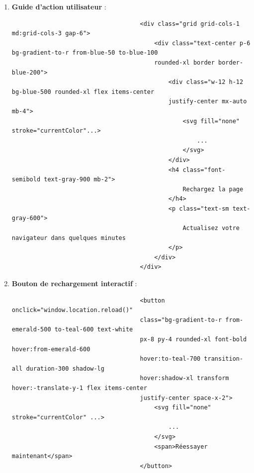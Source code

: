 \documentclass[a4paper,11pt]{article}
\begin{document}
\begin{enumerate}
                        \item \textbf{Guide d'action utilisateur} :
                            \begin{tcolorbox}[colback=lightgray!5, colframe=gray!80, left=-70mm, right=5mm, top=2mm, bottom=0mm, boxrule=0.1mm]
                                \begin{verbatim}
                                    <div class="grid grid-cols-1 md:grid-cols-3 gap-6">
                                        <div class="text-center p-6 bg-gradient-to-r from-blue-50 to-blue-100 
                                        rounded-xl border border-blue-200">
                                            <div class="w-12 h-12 bg-blue-500 rounded-xl flex items-center 
                                            justify-center mx-auto mb-4">
                                                <svg fill="none" stroke="currentColor"...>
                                                    ...
                                                </svg>
                                            </div>
                                            <h4 class="font-semibold text-gray-900 mb-2">
                                                Rechargez la page
                                            </h4>
                                            <p class="text-sm text-gray-600">
                                                Actualisez votre navigateur dans quelques minutes
                                            </p>
                                        </div>
                                    </div>
                                \end{verbatim}
                            \end{tcolorbox}

                        \item \textbf{Bouton de rechargement interactif} :
                            \begin{tcolorbox}[colback=lightgray!5, colframe=gray!80, left=-70mm, right=5mm, top=2mm, bottom=0mm, boxrule=0.1mm]
                                \begin{verbatim}
                                    <button onclick="window.location.reload()" 
                                    class="bg-gradient-to-r from-emerald-500 to-teal-600 text-white 
                                    px-8 py-4 rounded-xl font-bold hover:from-emerald-600 
                                    hover:to-teal-700 transition-all duration-300 shadow-lg 
                                    hover:shadow-xl transform hover:-translate-y-1 flex items-center 
                                    justify-center space-x-2">
                                        <svg fill="none" stroke="currentColor" ...>
                                            ...
                                        </svg>
                                        <span>Réessayer maintenant</span>
                                    </button>
                                \end{verbatim}
                            \end{tcolorbox}


\end{enumerate}
\end{document}
